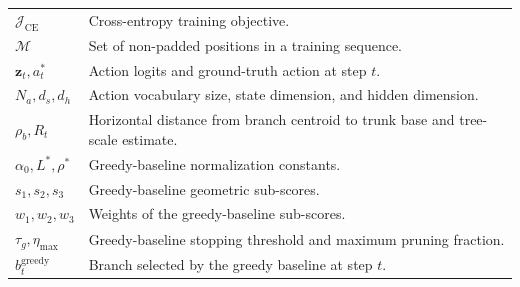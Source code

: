 \documentclass[12pt,a4paper,fontset=fandol]{ctexart}
\begin{document}
\begin{longtable}{>{\raggedright\arraybackslash}p{}
                  >{\raggedright\arraybackslash}p{}}
$\mathcal{J}_{\mathrm{CE}}$ & Cross-entropy training objective. \\
$\mathcal{M}$ & Set of non-padded positions in a training sequence. \\
$\mathbf{z}_t, a_t^*$ & Action logits and ground-truth action at step $t$. \\
$N_a, d_s, d_h$ & Action vocabulary size, state dimension, and hidden dimension. \\
$\rho_b, R_t$ & Horizontal distance from branch centroid to trunk base and tree-scale estimate. \\
$\alpha_0, L^*, \rho^*$ & Greedy-baseline normalization constants. \\
$s_1, s_2, s_3$ & Greedy-baseline geometric sub-scores. \\
$w_1, w_2, w_3$ & Weights of the greedy-baseline sub-scores. \\
$\tau_g, \eta_{\max}$ & Greedy-baseline stopping threshold and maximum pruning fraction. \\
$b_t^{\mathrm{greedy}}$ & Branch selected by the greedy baseline at step $t$. \\
\end{longtable}
\normalsize



\end{document}
